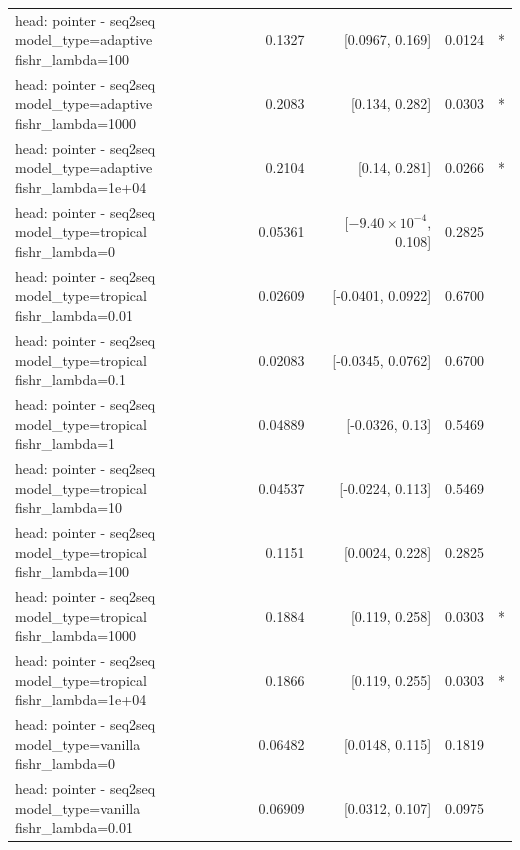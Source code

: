 \documentclass[10pt]{article}
\makeatletter
\newcommand{\stackcell}[1]{\begin{tabular}[t]{@{}l@{}}#1\end{tabular}}
\makeatother
\begin{document}
{\begin{longtable}{lrrrl}
\stackcell{head: pointer - seq2seq\\\footnotesize model\_type=adaptive fishr\_lambda=100 } & 0.1327 & [0.0967, 0.169] & 0.0124 & *\\
\stackcell{head: pointer - seq2seq\\\footnotesize model\_type=adaptive fishr\_lambda=1000 } & 0.2083 & [0.134, 0.282] & 0.0303 & *\\
\stackcell{head: pointer - seq2seq\\\footnotesize model\_type=adaptive fishr\_lambda=1e+04 } & 0.2104 & [0.14, 0.281] & 0.0266 & *\\
\stackcell{head: pointer - seq2seq\\\footnotesize model\_type=tropical fishr\_lambda=0 } & 0.05361 & [$-9.40\times10^{-4}$, 0.108] & 0.2825 & \\
\stackcell{head: pointer - seq2seq\\\footnotesize model\_type=tropical fishr\_lambda=0.01 } & 0.02609 & [-0.0401, 0.0922] & 0.6700 & \\
\stackcell{head: pointer - seq2seq\\\footnotesize model\_type=tropical fishr\_lambda=0.1 } & 0.02083 & [-0.0345, 0.0762] & 0.6700 & \\
\stackcell{head: pointer - seq2seq\\\footnotesize model\_type=tropical fishr\_lambda=1 } & 0.04889 & [-0.0326, 0.13] & 0.5469 & \\
\stackcell{head: pointer - seq2seq\\\footnotesize model\_type=tropical fishr\_lambda=10 } & 0.04537 & [-0.0224, 0.113] & 0.5469 & \\
\stackcell{head: pointer - seq2seq\\\footnotesize model\_type=tropical fishr\_lambda=100 } & 0.1151 & [0.0024, 0.228] & 0.2825 & \\
\stackcell{head: pointer - seq2seq\\\footnotesize model\_type=tropical fishr\_lambda=1000 } & 0.1884 & [0.119, 0.258] & 0.0303 & *\\
\stackcell{head: pointer - seq2seq\\\footnotesize model\_type=tropical fishr\_lambda=1e+04 } & 0.1866 & [0.119, 0.255] & 0.0303 & *\\
\stackcell{head: pointer - seq2seq\\\footnotesize model\_type=vanilla fishr\_lambda=0 } & 0.06482 & [0.0148, 0.115] & 0.1819 & \\
\stackcell{head: pointer - seq2seq\\\footnotesize model\_type=vanilla fishr\_lambda=0.01 } & 0.06909 & [0.0312, 0.107] & 0.0975 & \\

\end{longtable}}
\end{document}
